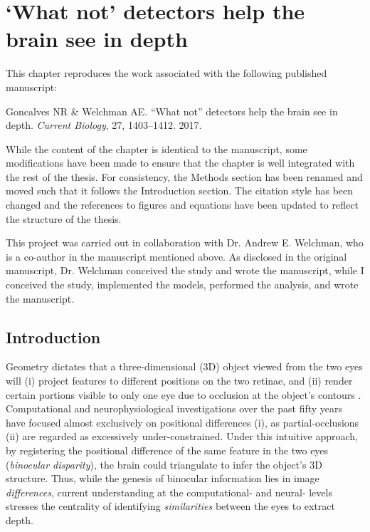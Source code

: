 \chapter{`What not' detectors help the brain see in depth}
\ifpdf
    \graphicspath{{chapter1/chapter1-figs/PNG/}{chapter1/chapter1-figs/PDF/}{chapter1/chapter1-figs/}}
\else
    \graphicspath{{chapter1/chapter1-figs/EPS/}{chapter1/chapter1-figs/}}
\fi

\newcommand{\runningTitle}{`What not' detectors}
\markboth{\MakeUppercase{\thechapter. \runningTitle }}{\thechapter. \runningTitle}

This chapter reproduces the work associated with the following published manuscript: 

Goncalves NR \& Welchman AE. ``What not'' detectors help the brain see in depth. \textit{Current Biology}, 27, 1403--1412. 2017.

While the content of the chapter is identical to the manuscript, some modifications have been made to ensure that the chapter is well integrated with the rest of the thesis. For consistency, the Methods section has been renamed and moved such that it follows the Introduction section. The citation style has been changed and the references to figures and equations have been updated to reflect the structure of the thesis.

This project was carried out in collaboration with Dr. Andrew E. Welchman, who is a co-author in the manuscript mentioned above. As disclosed in the original manuscript, Dr. Welchman conceived the study and wrote the manuscript, while I conceived the study, implemented the models, performed the analysis, and wrote the manuscript.

\section{Introduction}

Geometry dictates that a three-dimensional (3D) object viewed from the two eyes will (i) project features to different positions on the two retinae, and (ii) render certain portions visible to only one eye due to occlusion at the object's contours \cite{Wheatstone:1838xf}. Computational \cite{Julesz:1971uq,Marr:1976dq,Scharstein:2002by} and neurophysiological \cite{Cumming:2001jy} investigations over the past fifty years have focused almost exclusively on positional differences (i), as partial-occlusions (ii) are regarded as excessively under-constrained. Under this intuitive approach, by registering the positional difference of the same feature in the two eyes ({\it binocular disparity}), the brain could triangulate to infer the object's 3D structure. Thus, while the genesis of binocular information lies in image \emph {differences}, current understanding at the computational- and neural- levels stresses the centrality of identifying \emph {similarities} between the eyes to extract depth.

